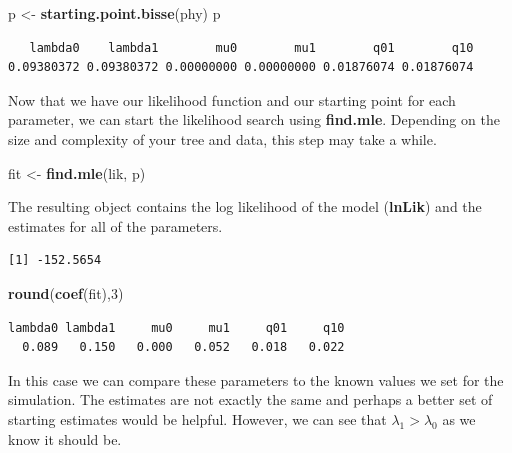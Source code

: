\documentclass[
]{book}
\newenvironment{Shaded}{\begin{snugshade}}{\end{snugshade}}
\newcommand{\DecValTok}[1]{\textcolor[rgb]{0.00,0.00,0.81}{#1}}
\newcommand{\KeywordTok}[1]{\textcolor[rgb]{0.13,0.29,0.53}{\textbf{#1}}}
\newcommand{\NormalTok}[1]{#1}
\newcommand{\OperatorTok}[1]{\textcolor[rgb]{0.81,0.36,0.00}{\textbf{#1}}}
\newcommand{\StringTok}[1]{\textcolor[rgb]{0.31,0.60,0.02}{#1}}
\begin{document}
\begin{Shaded}
\begin{Highlighting}[]
\NormalTok{p \textless{}{-}}\StringTok{ }\KeywordTok{starting.point.bisse}\NormalTok{(phy)}
\NormalTok{p}
\end{Highlighting}
\end{Shaded}

\begin{verbatim}
   lambda0    lambda1        mu0        mu1        q01        q10 
0.09380372 0.09380372 0.00000000 0.00000000 0.01876074 0.01876074 
\end{verbatim}

Now that we have our likelihood function and our starting point for each parameter, we can start the likelihood search using \textbf{find.mle}. Depending on the size and complexity of your tree and data, this step may take a while.

\begin{Shaded}
\begin{Highlighting}[]
\NormalTok{fit \textless{}{-}}\StringTok{ }\KeywordTok{find.mle}\NormalTok{(lik, p)}
\end{Highlighting}
\end{Shaded}

The resulting object contains the log likelihood of the model (\textbf{lnLik}) and the estimates for all of the parameters.

\begin{Shaded}
\end{Shaded}

\begin{verbatim}
[1] -152.5654
\end{verbatim}

\begin{Shaded}
\begin{Highlighting}[]
\KeywordTok{round}\NormalTok{(}\KeywordTok{coef}\NormalTok{(fit),}\DecValTok{3}\NormalTok{)}
\end{Highlighting}
\end{Shaded}

\begin{verbatim}
lambda0 lambda1     mu0     mu1     q01     q10 
  0.089   0.150   0.000   0.052   0.018   0.022 
\end{verbatim}

In this case we can compare these parameters to the known values we set for the simulation. The estimates are not exactly the same and perhaps a better set of starting estimates would be helpful. However, we can see that \(\lambda_{1} > \lambda_{0}\) as we know it should be.
\end{document}
